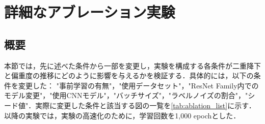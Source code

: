 \begin{table}[h]
\centering
    \caption[The correlation coefficients and scores for the three phases]{
    The correlation coefficients and scores for the three phases divided according to the method defined in (\cref{sec:Phase division of double descent}). It shows the Epoch range used to calculate the correlation coefficients, the correlation coefficients calculated from Test Error and Shape bias, the correlation coefficients calculated from Test Error and Texture bias, and the correlation score computed from these two correlation coefficients.
    }
    
    \label{tab:base_condition_result}
\end{table}

\newpage

\section{詳細なアブレーション実験}
\subsection{概要}
本節では，先に述べた条件から一部を変更し，実験を構成する各条件が二重降下と偏重度の推移にどのように影響を与えるかを検証する．具体的には，以下の条件を変更した： "事前学習の有無"，"使用データセット"，"ResNet Family内でのモデル変更"，"使用CNNモデル"，"バッチサイズ"，"ラベルノイズの割合"，"シード値"．実際に変更した条件と該当する図の一覧を\cref{tab:ablation_list}に示す．以降の実験では，実験の高速化のために，学習回数を1,000 epochとした．

